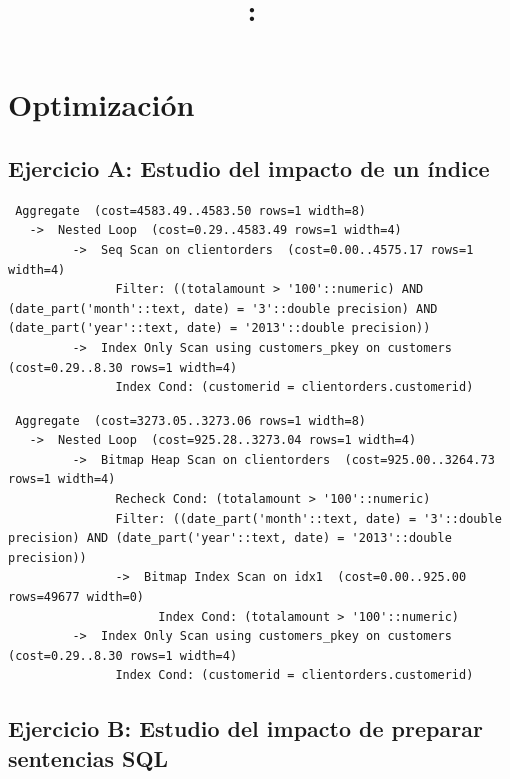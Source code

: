 \documentclass{article}
\title{
    \vspace{2in}
    \textmd{\textbf{\hmwkClass:\ \hmwkTitle}}\\
    \vspace{3in}
}
\author{\textbf{\hmwkAuthorName}}
\begin{document}
\maketitle



\newpage
\tableofcontents
\newpage
\section{Optimización}
\subsection{Ejercicio A: {\small Estudio del impacto de un índice}}
\begin{lstlisting}
 Aggregate  (cost=4583.49..4583.50 rows=1 width=8)
   ->  Nested Loop  (cost=0.29..4583.49 rows=1 width=4)
         ->  Seq Scan on clientorders  (cost=0.00..4575.17 rows=1 width=4)
               Filter: ((totalamount > '100'::numeric) AND (date_part('month'::text, date) = '3'::double precision) AND (date_part('year'::text, date) = '2013'::double precision))
         ->  Index Only Scan using customers_pkey on customers  (cost=0.29..8.30 rows=1 width=4)
               Index Cond: (customerid = clientorders.customerid)
\end{lstlisting}
\begin{lstlisting}
 Aggregate  (cost=3273.05..3273.06 rows=1 width=8)
   ->  Nested Loop  (cost=925.28..3273.04 rows=1 width=4)
         ->  Bitmap Heap Scan on clientorders  (cost=925.00..3264.73 rows=1 width=4)
               Recheck Cond: (totalamount > '100'::numeric)
               Filter: ((date_part('month'::text, date) = '3'::double precision) AND (date_part('year'::text, date) = '2013'::double precision))
               ->  Bitmap Index Scan on idx1  (cost=0.00..925.00 rows=49677 width=0)
                     Index Cond: (totalamount > '100'::numeric)
         ->  Index Only Scan using customers_pkey on customers  (cost=0.29..8.30 rows=1 width=4)
               Index Cond: (customerid = clientorders.customerid)
\end{lstlisting}
\subsection{Ejercicio B: {\small Estudio del impacto de preparar sentencias SQL}}
\end{document}
